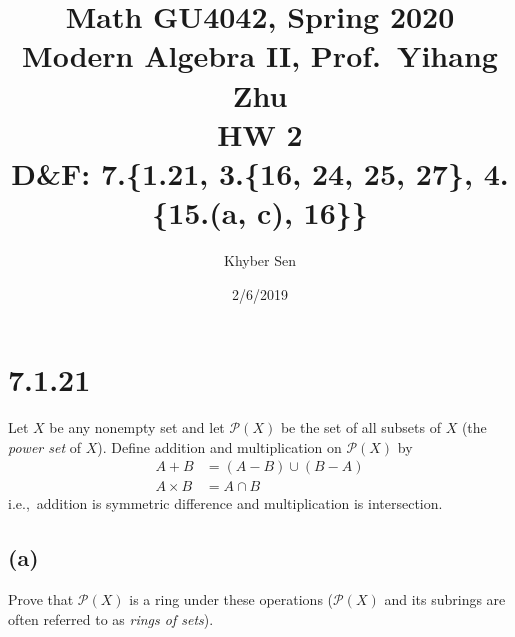\documentclass[fleqn]{article}
\title{
Math GU4042, Spring 2020 \\
Modern Algebra II, Prof.\ Yihang Zhu \\
HW 2 \\
D\&F: 7.\{1.21, 3.\{16, 24, 25, 27\}, 4.\{15.(a, c), 16\}\}
}
\author{Khyber Sen}
\date{2/6/2019}
\begin{document}
    
    \maketitle
    
    \section{7.1.21}
    Let $X$ be any nonempty set and let $\mathcal{P}(X)$ be the set of all subsets of $X$ (the \textit{power set} of $X$).  Define addition and multiplication on $\mathcal{P}(X)$ by
    \begin{align}
        A + B &= (A - B) \cup (B - A) \\
        A \times B &= A \cap B
    \end{align}
    i.e.,\ addition is symmetric difference and multiplication is intersection.
        
        \subsection{(a)}
        Prove that $\mathcal{P}(X)$ is a ring under these operations ($\mathcal{P}(X)$ and its subrings are often referred to as \textit{rings of sets}).
            
\end{document}
